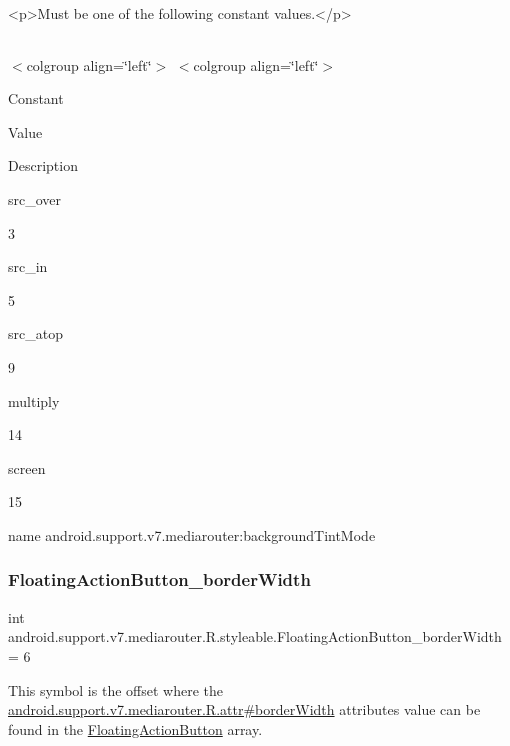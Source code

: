 \begin{DoxyVerb}      <p>Must be one of the following constant values.</p>
\end{DoxyVerb}
 \tabulinesep=1mm
\begin{longtabu} spread 0pt [c]{*{0}{|X[-1]}|}
\hline
\end{longtabu}
$<$colgroup align=\char`\"{}left\char`\"{}$>$ $<$colgroup align=\char`\"{}left\char`\"{}$>$ 

Constant

Value

Description 

{\ttfamily src\+\_\+over}

3

{\ttfamily src\+\_\+in}

5

{\ttfamily src\+\_\+atop}

9

{\ttfamily multiply}

14

{\ttfamily screen}

15

name android.\+support.\+v7.\+mediarouter\+:background\+Tint\+Mode \mbox{\label{classandroid_1_1support_1_1v7_1_1mediarouter_1_1R_1_1styleable_a3062421234c87b23595c467fe125d6f8}} 
\subsubsection{\texorpdfstring{Floating\+Action\+Button\+\_\+border\+Width}{FloatingActionButton\_borderWidth}}
{\footnotesize\ttfamily int android.\+support.\+v7.\+mediarouter.\+R.\+styleable.\+Floating\+Action\+Button\+\_\+border\+Width = 6\hspace{0.3cm}{\ttfamily [static]}}

This symbol is the offset where the \hyperlink{classandroid_1_1support_1_1v7_1_1mediarouter_1_1R_1_1attr_a5fab87200d63b1590fc241cc86ba4474}{android.\+support.\+v7.\+mediarouter.\+R.\+attr\#border\+Width} attribute\textquotesingle{}s value can be found in the \hyperlink{classandroid_1_1support_1_1v7_1_1mediarouter_1_1R_1_1styleable_ae665bad1758a0b708ec034929b76af91}{Floating\+Action\+Button} array.

